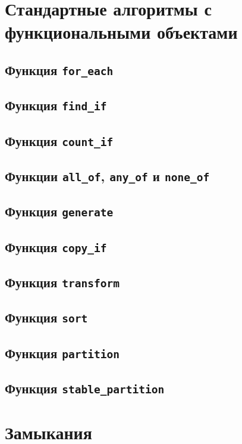 \documentclass{article}
\begin{document}
\newpage
\section*{Стандартные алгоритмы с функциональными объектами}


\subsection*{Функция \texttt{for\_each}}
\subsection*{Функция \texttt{find\_if}}
\subsection*{Функция \texttt{count\_if}}
\subsection*{Функции \texttt{all\_of}, \texttt{any\_of} и \texttt{none\_of}}
\subsection*{Функция \texttt{generate}}
\subsection*{Функция \texttt{copy\_if}}
\subsection*{Функция \texttt{transform}}
\subsection*{Функция \texttt{sort}}
\subsection*{Функция \texttt{partition}}
\subsection*{Функция \texttt{stable\_partition}}



\newpage
\section*{Замыкания}
\end{document}
